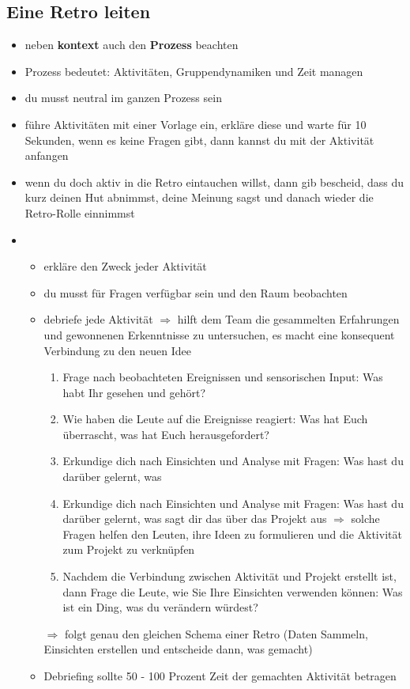\subsection{Eine Retro leiten}
\begin{itemize}
  \item neben \textbf{kontext} auch den \textbf{Prozess} beachten
  \item Prozess bedeutet: Aktivitäten, Gruppendynamiken und Zeit managen
  \item du musst neutral im ganzen Prozess sein
  \item führe Aktivitäten mit einer Vorlage ein, erkläre diese und warte für 10 Sekunden, wenn es
    keine Fragen gibt, dann kannst du mit der Aktivität anfangen
  \item wenn du doch aktiv in die Retro eintauchen willst, dann gib bescheid, dass du kurz
    deinen Hut abnimmst, deine Meinung sagst und danach wieder die Retro-Rolle einnimmst
  \item {}
    \begin{itemize}
      \item erkläre den Zweck jeder Aktivität
      \item du musst für Fragen verfügbar sein und den Raum beobachten
      \item debriefe jede Aktivität $\Rightarrow$  hilft dem Team die gesammelten Erfahrungen und
        gewonnenen Erkenntnisse zu untersuchen, es macht eine konsequent Verbindung zu den neuen
        Idee
        \begin{enumerate}
          \item Frage nach beobachteten Ereignissen und sensorischen Input: Was habt Ihr gesehen und
            gehört?
          \item Wie haben die Leute auf die Ereignisse reagiert: Was hat Euch überrascht, was hat
            Euch herausgefordert?
          \item Erkundige dich nach Einsichten und Analyse mit Fragen: Was hast du darüber gelernt, was
          \item Erkundige dich nach Einsichten und Analyse mit Fragen: Was hast du darüber gelernt, was
            sagt dir das über das Projekt aus $\Rightarrow$  solche Fragen helfen den Leuten, ihre
          Ideen zu formulieren und die Aktivität zum Projekt zu verknüpfen
        \item Nachdem die Verbindung zwischen Aktivität und Projekt erstellt ist, dann Frage die
          Leute, wie Sie Ihre Einsichten verwenden können: Was ist ein Ding, was du verändern
          würdest?
        \end{enumerate}

        $\Rightarrow$  folgt genau den gleichen Schema einer Retro (Daten Sammeln, Einsichten
      erstellen und entscheide dann, was gemacht)
      \item Debriefing sollte 50 - 100 Prozent Zeit der gemachten Aktivität betragen
    \end{itemize}
\end{itemize}


